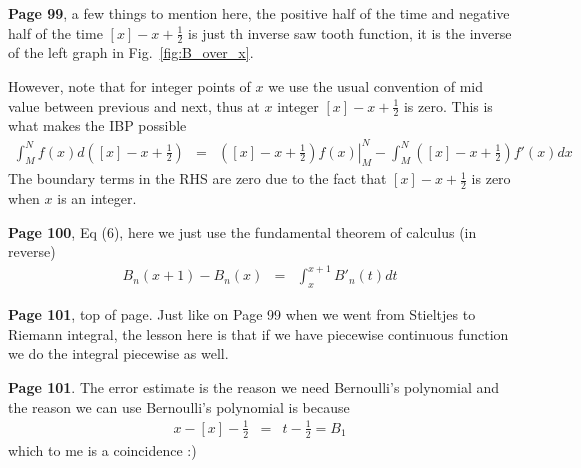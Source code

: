 \documentclass[aps,preprint,preprintnumbers,nofootinbib,showpacs,prd]{revtex4-1}
\newcommand{\nbea}{\begin{eqnarray*}}
\newcommand{\neea}{\end{eqnarray*}}
\begin{document}
{\bf Page 99}, a few things to mention here, the positive half of the time and negative half of the time $[x] - x + \frac{1}{2}$ is just th inverse saw tooth function, it is the inverse of the left graph in Fig.~\ref{fig:B_over_x}.

However, note that for integer points of $x$ we use the usual convention of mid value between previous and next, thus at $x$ integer $[x] - x + \frac{1}{2}$ is zero. This is what makes the IBP possible
%
\nbea
\int_M^N f(x) d([x] - x + \frac{1}{2}) & = & \left. ([x] - x + \frac{1}{2}) f(x) \right|_M^N - \int_M^N ([x] - x + \frac{1}{2}) f'(x) dx
\neea
%
The boundary terms in the RHS are zero due to the fact that $[x] - x + \frac{1}{2}$ is zero when $x$ is an integer.

{\bf Page 100}, Eq (6), here we just use the fundamental theorem of calculus (in reverse)
%
\nbea
B_n(x+1) - B_n(x) & = & \int_x^{x+1} B'_n(t) dt
\neea
%

{\bf Page 101}, top of page. Just like on Page 99 when we went from Stieltjes to Riemann integral, the lesson here is that if we have piecewise continuous function we do the integral piecewise as well.

{\bf Page 101}. The error estimate is the reason we need Bernoulli's polynomial and the reason we can use Bernoulli's polynomial is because
%
\nbea
x -[x] - \frac{1}{2} & = & t - \frac{1}{2} = B_1
\neea
%
which to me is a coincidence :)
\end{document}
